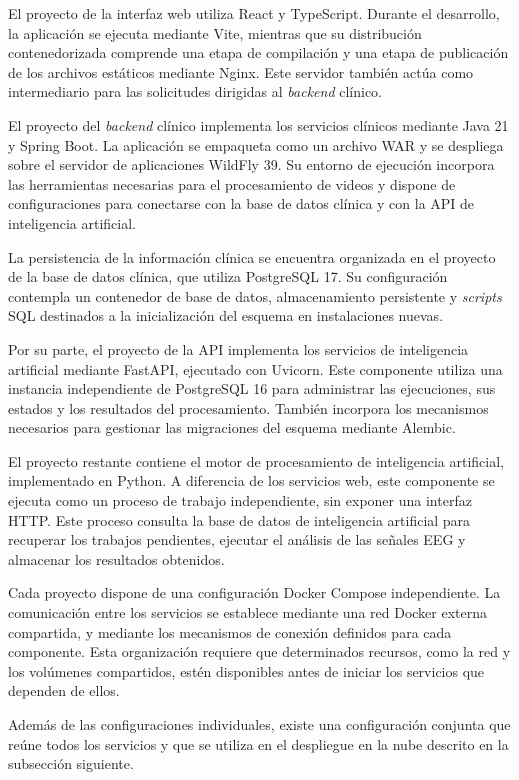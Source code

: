 El proyecto de la interfaz web utiliza React y TypeScript.
Durante el desarrollo, la aplicación se ejecuta mediante Vite,
mientras que su distribución contenedorizada comprende una
etapa de compilación y una etapa de publicación de los
archivos estáticos mediante Nginx. Este servidor también
actúa como intermediario para las solicitudes dirigidas
al \textit{backend} clínico.

El proyecto del \textit{backend} clínico implementa los
servicios clínicos mediante Java 21 y Spring Boot. La
aplicación se empaqueta como un archivo WAR y se despliega
sobre el servidor de aplicaciones WildFly 39. Su entorno
de ejecución incorpora las herramientas necesarias para
el procesamiento de videos y dispone de configuraciones
para conectarse con la base de datos clínica y con la
API de inteligencia artificial.

La persistencia de la información clínica se encuentra
organizada en el proyecto de la base de datos clínica,
que utiliza PostgreSQL 17. Su configuración contempla
un contenedor de base de datos, almacenamiento persistente
y \textit{scripts} SQL destinados a la inicialización del esquema
en instalaciones nuevas.

Por su parte, el proyecto de la API implementa
los servicios de inteligencia artificial mediante FastAPI,
ejecutado con Uvicorn. Este componente utiliza una instancia
independiente de PostgreSQL 16 para administrar las ejecuciones,
sus estados y los resultados del procesamiento. También
incorpora los mecanismos necesarios para gestionar las
migraciones del esquema mediante Alembic.

El proyecto restante contiene el motor de
procesamiento de inteligencia artificial, implementado
en Python. A diferencia de los servicios web, este componente
se ejecuta como un proceso de trabajo independiente, sin
exponer una interfaz HTTP. Este proceso consulta la base de datos de inteligencia artificial para
recuperar los trabajos pendientes, ejecutar el análisis
de las señales EEG y almacenar los resultados obtenidos.

Cada proyecto dispone de una configuración Docker Compose
independiente. La comunicación entre los servicios se
establece mediante una red Docker externa compartida, y mediante los mecanismos
de conexión definidos para cada componente. Esta
organización requiere que determinados recursos, como
la red y los volúmenes compartidos, estén disponibles
antes de iniciar los servicios que dependen de ellos.

Además de las configuraciones individuales, existe una configuración conjunta que reúne todos los servicios y que se utiliza en el despliegue en la nube descrito en la subsección siguiente.

